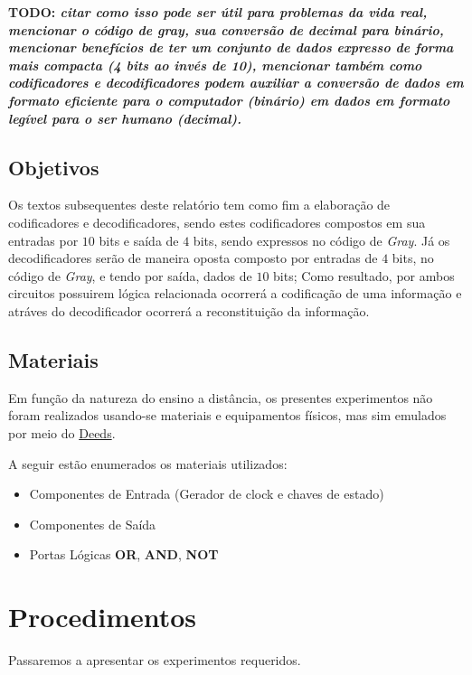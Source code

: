 \documentclass[12pt]{article}
\begin{document}
\textbf{TODO: \emph{citar como isso pode ser útil para problemas da vida real,
    mencionar o código de gray, sua conversão de decimal para binário, mencionar
    benefícios de ter um conjunto de dados expresso de forma mais compacta (4
    bits ao invés de 10), mencionar também como codificadores e decodificadores
    podem auxiliar a conversão de dados em formato eficiente para o computador
    (binário) em dados em formato legível para o ser humano (decimal). }}

\subsection{Objetivos}
\label{sec:Objetivos}

Os textos subsequentes deste relatório tem como fim a elaboração de
codificadores e decodificadores, sendo estes codificadores compostos em sua
entradas por $10$ bits e saída de $4$ bits, sendo expressos no código de
\emph{Gray}. Já os decodificadores serão de maneira oposta composto por entradas
de $4$ bits, no código de \emph{Gray}, e tendo por saída, dados de $10$ bits;
Como resultado, por ambos circuitos possuirem lógica relacionada ocorrerá a
codificação de uma informação e atráves do decodificador ocorrerá a
reconstituição da informação.

\subsection{Materiais}
\label{sec:Materiais}
Em função da natureza do ensino a distância, os presentes experimentos não foram
realizados usando-se materiais e equipamentos físicos, mas sim emulados por meio
do \href{https://www.digitalelectronicsdeeds.com/deeds.html}{Deeds}.

A seguir estão enumerados os materiais utilizados:
\begin{itemize}
    \item Componentes de Entrada (Gerador de clock e chaves de estado)
    \item Componentes de Saída
    \item Portas Lógicas \textbf{OR}, \textbf{AND}, \textbf{NOT}
\end{itemize}

\section{Procedimentos}
\label{sec:Procedimentos}

Passaremos a apresentar os experimentos requeridos.
\end{document}
